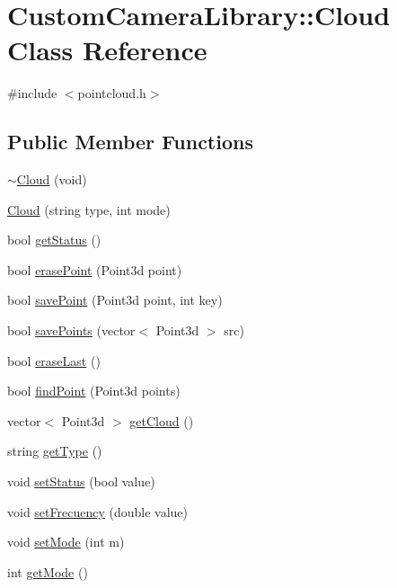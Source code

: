 \hypertarget{class_custom_camera_library_1_1_cloud}{}\section{Custom\+Camera\+Library\+:\+:Cloud Class Reference}
\label{class_custom_camera_library_1_1_cloud}


{\ttfamily \#include $<$pointcloud.\+h$>$}

\subsection*{Public Member Functions}
\begin{DoxyCompactItemize}
\item 
\hyperlink{class_custom_camera_library_1_1_cloud_a7ad1af30f701dd0a82f20ecee98c3e25}{$\sim$\+Cloud} (void)
\item 
\hyperlink{class_custom_camera_library_1_1_cloud_a920a635f7d3dbf35d11d04a275027081}{Cloud} (string type, int mode)
\item 
bool \hyperlink{class_custom_camera_library_1_1_cloud_a42e1fd715a105ec1c3c2be46e4e91bb7}{get\+Status} ()
\item 
bool \hyperlink{class_custom_camera_library_1_1_cloud_a6ad13d5ec67f897029bcdbb167b5cd84}{erase\+Point} (Point3d point)
\item 
bool \hyperlink{class_custom_camera_library_1_1_cloud_ac32829296aa556111215b69151b8b58b}{save\+Point} (Point3d point, int key)
\item 
bool \hyperlink{class_custom_camera_library_1_1_cloud_a64d0c4af8b0e38f5ce679de0a21565f3}{save\+Points} (vector$<$ Point3d $>$ src)
\item 
bool \hyperlink{class_custom_camera_library_1_1_cloud_a09b004f655945186f8c83716453c9234}{erase\+Last} ()
\item 
bool \hyperlink{class_custom_camera_library_1_1_cloud_afc9cde13086bae7a85b37a32b20881a5}{find\+Point} (Point3d points)
\item 
vector$<$ Point3d $>$ \hyperlink{class_custom_camera_library_1_1_cloud_afd1c9df50984cc2cc84a45049443d7c9}{get\+Cloud} ()
\item 
string \hyperlink{class_custom_camera_library_1_1_cloud_ad2df0710c82fabf6e6821411a82334ba}{get\+Type} ()
\item 
void \hyperlink{class_custom_camera_library_1_1_cloud_a252e76c6498af691571771f4ee7a09a3}{set\+Status} (bool value)
\item 
void \hyperlink{class_custom_camera_library_1_1_cloud_a227b53ed0c999d2268c44479490f3acc}{set\+Frecuency} (double value)
\item 
void \hyperlink{class_custom_camera_library_1_1_cloud_a2238f0056b3d8bd519e600b29bde7bf5}{set\+Mode} (int m)
\item 
int \hyperlink{class_custom_camera_library_1_1_cloud_abbb4e3cea8f700c1064bd2325ca706a3}{get\+Mode} ()
\end{DoxyCompactItemize}


